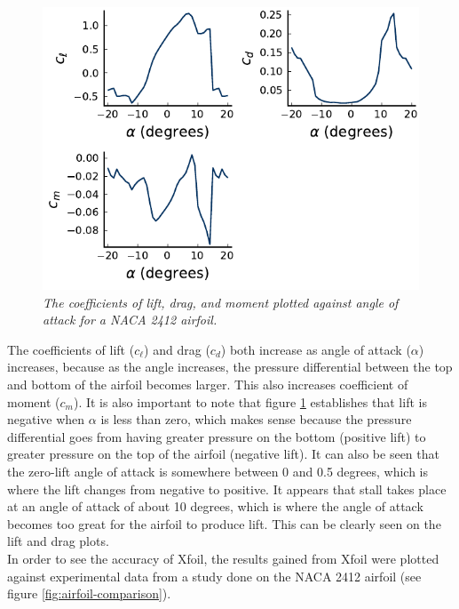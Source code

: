 \documentclass{journal}
\begin{document}
	\begin{figure}[H]
		\centering
		\includegraphics{../graphics/aoa-coefficients.pdf}
		\caption{\emph{The coefficients of lift, drag, and moment plotted against angle of attack for a NACA 2412 airfoil.}}
		\label{fig:aoa-coefficients}
	\end{figure}
	
	The coefficients of lift (\(c_\ell\)) and drag (\(c_d\)) both increase as angle of attack (\(\alpha\)) increases, because as the angle increases, the pressure differential between the top and bottom of the airfoil becomes larger. This also increases coefficient of moment (\(c_m\)). It is also important to note that figure \ref{fig:aoa-coefficients} establishes that lift is negative when \(\alpha\) is less than zero, which makes sense because the pressure differential goes from having greater pressure on the bottom (positive lift) to greater pressure on the top of the airfoil (negative lift). It can also be seen that the zero-lift angle of attack is somewhere between 0 and 0.5 degrees, which is where the lift changes from negative to positive. It appears that stall takes place at an angle of attack of about 10 degrees, which is where the angle of attack becomes too great for the airfoil to produce lift. This can be clearly seen on the lift and drag plots.\\
	
	In order to see the accuracy of Xfoil, the results gained from Xfoil were plotted against experimental data from a study done on the NACA 2412 airfoil (see figure \ref{fig:airfoil-comparison}).\\
	
\end{document}
